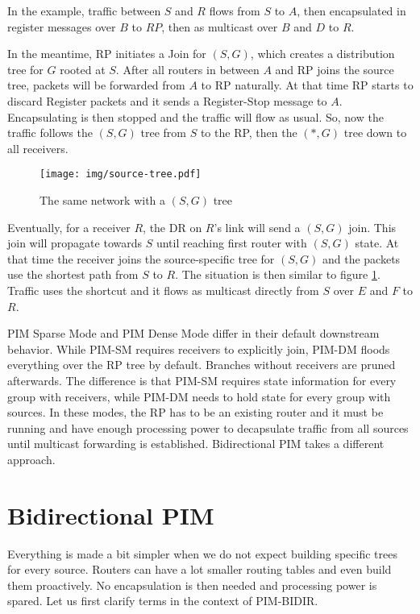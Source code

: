 In the example, traffic between $S$ and $R$ flows from $S$ to $A$, then
encapsulated in register messages over $B$ to $RP$, then as multicast over $B$
and $D$ to $R$.

In the meantime, RP initiates a Join for $(S, G)$, which creates a distribution
tree for $G$ rooted at $S$. After all routers in between $A$ and RP joins the
source tree, packets will be forwarded from $A$ to RP naturally. At that time
RP starts to discard Register packets and it sends a Register-Stop message to
$A$. Encapsulating is then stopped and the traffic will flow as usual. So, now
the traffic follows the $(S,G)$ tree from $S$ to the RP, then the $(*,G)$ tree
down to all receivers.

\begin{figure}[htp]
\centering
\texttt{[image: img/source-tree.pdf]}
\caption{The same network with a $(S,G)$ tree}
\label{sg-tree}
\end{figure}

Eventually, for a receiver $R$, the DR on $R$'s link will send a $(S, G)$ join.
This join will propagate towards $S$ until reaching first router with $(S,G)$
state. At that time the receiver joins the source-specific tree for $(S,G)$ and
the packets use the shortest path from $S$ to $R$. The situation is then similar to
figure \ref{sg-tree}. Traffic uses the shortcut and it flows as multicast
directly from $S$ over $E$ and $F$ to $R$.

PIM Sparse Mode and PIM Dense Mode differ in their default downstream behavior.
While PIM-SM requires receivers to explicitly join, PIM-DM floods everything
over the RP tree by default. Branches without receivers are pruned afterwards.
The difference is that PIM-SM requires state information for every group with
receivers, while PIM-DM needs to hold state for every group with sources.
In these modes, the RP has to be an existing router and it must be running and have
enough processing power to decapsulate traffic from all sources until multicast
forwarding is established. Bidirectional PIM takes a different approach.

\section{Bidirectional PIM}

Everything is made a bit simpler when we do not expect building specific trees
for every source. Routers can have a lot smaller routing tables and even build
them proactively. No encapsulation is then needed and processing power is
spared. Let us first clarify terms in the context of PIM-BIDIR.

